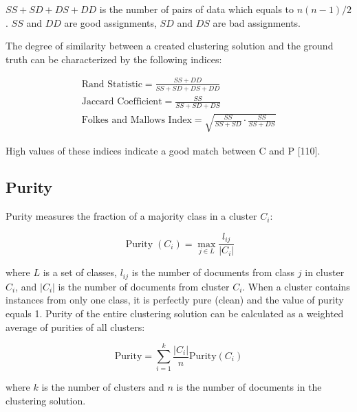 \documentclass[11pt,openany,executivepaper]{book}
\begin{document}
$S S+S D+D S+D D$ is the number of pairs of data which equals to $n(n-1) / 2$. $S S$ and $D D$ are good assignments, $S D$ and $D S$ are bad assignments.

The degree of similarity between a created clustering solution and the ground truth can be characterized by the following indices:


\begin{gather}
\text{Rand Statistic} = \frac{SS + DD}{SS + SD + DS + DD} \\
\text{Jaccard Coefficient} = \frac{SS}{SS + SD + DS} \\
\text{Folkes and Mallows Index} = \sqrt{\frac{SS}{SS + SD} \cdot \frac{SS}{SS + DS}}
\end{gather}

High values of these indices indicate a good match between C and P [110].

\subsection*{Purity}
Purity measures the fraction of a majority class in a cluster $C_{i}$:

\begin{equation}
\operatorname{Purity}\left(C_{i}\right)=\max _{j \in L} \frac{l_{i j}}{\left|C_{i}\right|}
\end{equation}

where $L$ is a set of classes, $l_{i j}$ is the number of documents from class $j$ in cluster $C_{i}$, and $\left|C_{i}\right|$ is the number of documents from cluster $C_{i}$. When a cluster contains instances from only one class, it is perfectly pure (clean) and the value of purity equals 1. Purity of the entire clustering solution can be calculated as a weighted average of purities of all clusters:

\begin{equation}
\text{Purity} = \sum_{i=1}^{k} \frac{\left|C_{i}\right|}{n} \text{Purity}\left(C_{i}\right)
\end{equation}

where $k$ is the number of clusters and $n$ is the number of documents in the clustering solution.
\end{document}
